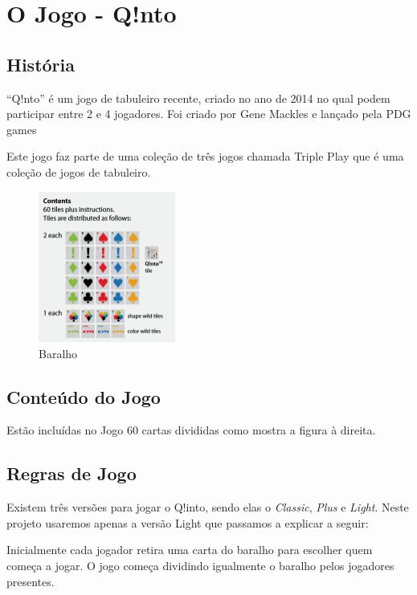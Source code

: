 \documentclass[a4paper]{article}
\begin{document}
	\newpage

	\section{O Jogo - Q!nto}
	\subsection{História}
	
	“Q!nto” é um jogo de tabuleiro recente, criado no ano de 2014 no qual podem participar entre 2 e 4 jogadores. Foi criado por Gene Mackles e lançado pela PDG games
	
	Este jogo faz parte de uma coleção de três jogos chamada Triple Play que é uma coleção de jogos de tabuleiro.
	
	\begin{figure}
	\includegraphics[width=0.4\textwidth]{./res/cards.png}
	\caption{\label{fig:Baralho}Baralho}
	\end{figure}
	
	\subsection{Conteúdo do Jogo}
	
	Estão incluídas no Jogo 60 cartas divididas como mostra a figura à direita.
	
	\subsection{Regras de Jogo}
	
	Existem três versões para jogar o Q!into, sendo elas o
	\textit{Classic},
	\textit{Plus} e
	\textit{Light}. Neste projeto usaremos apenas a versão Light que passamos a explicar a seguir:
	
	Inicialmente cada jogador retira uma carta do baralho para escolher quem começa a jogar. O jogo começa dividindo igualmente o baralho pelos jogadores presentes.
	
\end{document}
